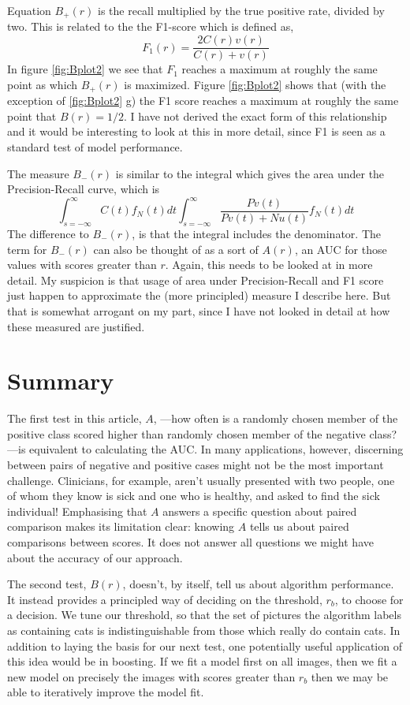 \documentclass{article}
\begin{document}
Equation $B_+(r)$ is the recall multiplied by the true positive rate, divided by two. This is related to the the F1-score which is defined as,
\begin{equation}
F_1(r) =  \frac{2 C(r) v(r)}{C(r) + v(r)}   \label{eq:F1}
\end{equation}
In figure \ref{fig:Bplot2} we see that $F_1$ reaches a maximum at roughly the same point as which $B_+(r)$ is maximized.  Figure \ref{fig:Bplot2} shows that (with the exception of \ref{fig:Bplot2} g) the F1 score reaches a maximum at roughly the same point that $B(r)=1/2$. I have not derived the exact form of this relationship and it would be interesting to look at this in more detail, since F1 is seen as a standard test of model performance.

The measure $B_-(r)$ is similar to the integral which gives the area under the Precision-Recall curve, which is
\[
\int_{s=-\infty}^{\infty}  C(t) f_N(t) dt  \int_{s=-\infty}^{\infty}  \frac{P v(t)}{P v(t) + N u(t)} f_N(t) dt 
\]
The difference to $B_-(r)$, is that the integral includes the denominator. The term for $B_-(r)$ can also be thought of as a sort of $A(r)$, an AUC for those values with scores greater than $r$. Again, this needs to be looked at in more detail. My suspicion is that usage of area under Precision-Recall and F1 score just happen to approximate the (more principled) measure I describe here. But that is somewhat arrogant on my part, since I have not looked in detail at how these measured are justified.


\section{Summary}

The first test in this article, $A$, ---how often is a randomly chosen member of the positive class scored higher than randomly chosen member of the negative class?---is equivalent to calculating the AUC. In many applications, however, discerning between pairs of negative and positive cases might not be the most important challenge. Clinicians, for example, aren't usually presented with two people, one of whom they know is sick and one who is healthy, and asked to find the sick individual! Emphasising that $A$ answers a specific question about paired comparison makes its limitation clear: knowing $A$ tells us about paired comparisons between scores. It does not answer all questions we might have about the accuracy of our approach.

The second test, $B(r)$, doesn't, by itself, tell us about algorithm performance. It instead provides a principled way of deciding on the threshold, $r_b$, to choose for a decision. We tune our threshold, so that the set of pictures the algorithm labels as containing cats is indistinguishable from those which really do contain cats. In addition to laying the basis for our next test, one potentially useful application of this idea would be in boosting. If we fit a model first on all images, then we fit a new model on precisely the images with scores greater than $r_b$ then we may be able to iteratively improve the model fit.
\end{document}
